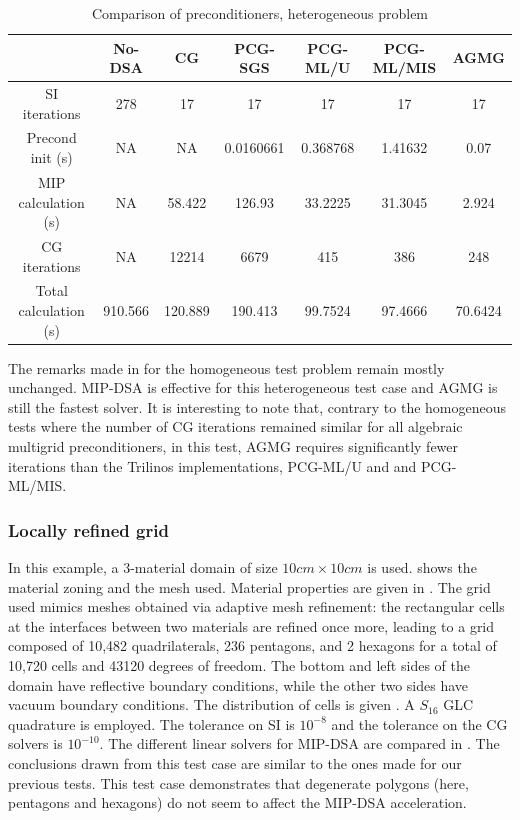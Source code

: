 %
%
\begin{table}[!htbp]
  \begin{center}
    \caption{Comparison of preconditioners, heterogeneous problem}
    \begin{tabular}{|c|c|c|c|c|c|c|}
      \hline
      & No-DSA & CG & PCG-SGS & PCG-ML/U & PCG-ML/MIS & AGMG\\
      \hline
      SI iterations & 278     & 17      & 17        & 17       & 17      & 17  \\
   Precond init (s) & NA      & NA      & 0.0160661 & 0.368768 & 1.41632 &
      0.07  \\
MIP calculation (s) & NA      & 58.422  & 126.93    & 33.2225  & 31.3045 &
      2.924 \\
      CG iterations & NA      & 12214   & 6679      & 415      & 386     & 248  \\
Total calculation (s) & 910.566 & 120.889 & 190.413 & 99.7524  & 97.4666 &
      70.6424 \\      
      \hline
    \end{tabular}
    \label{comparison_hex}
  \end{center}
\end{table}
%
The remarks made in  for the homogeneous test problem
remain mostly unchanged. MIP-DSA is effective for this heterogeneous test case and AGMG is
still the fastest solver. It is interesting to note that, contrary to the
homogeneous tests where the number of CG iterations remained similar for all
algebraic multigrid preconditioners, in this test, AGMG requires
significantly fewer iterations than the Trilinos implementations, PCG-ML/U and and PCG-ML/MIS.

\subsubsection{Locally refined grid}

In this example, a 3-material domain of size $10cm\times 10cm$ is used. 
 shows the material zoning and the mesh used. Material properties 
are given in . The grid used mimics meshes obtained via adaptive mesh
refinement: the rectangular cells at the interfaces between two materials are refined once more,
leading to a grid composed of 10,482 quadrilaterals, 236 pentagons,
and 2 hexagons for a total of 10,720 cells and 43120 degrees of freedom. The bottom
and left sides of the domain have reflective boundary conditions, while the other two sides
have vacuum boundary conditions. 
%
The distribution of cells is given .
A $S_{16}$ GLC quadrature is employed. The tolerance on SI is $10^{-8}$ and
the tolerance on the CG solvers is $10^{-10}$.
The different linear solvers for MIP-DSA are compared in .
%
The conclusions drawn from this test case are similar to the ones made for 
our previous tests. This test case demonstrates that degenerate polygons 
(here, pentagons and hexagons) do not seem to affect the MIP-DSA acceleration.

